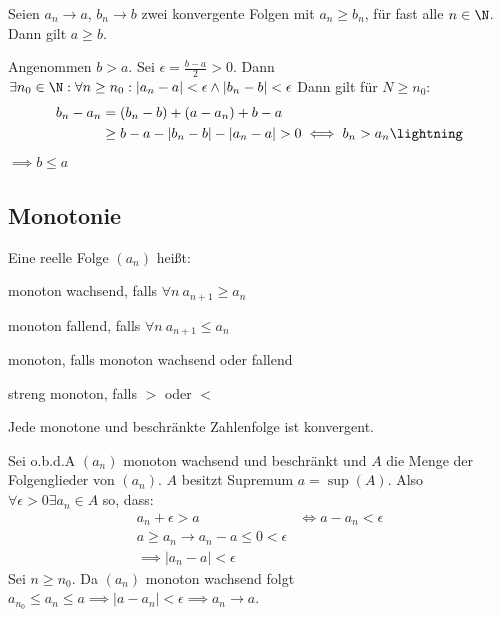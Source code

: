\begin{theorem}
	Seien $a_n\to a$, $b_n\to b$ zwei konvergente Folgen mit $a_n\geq b_n$, für fast alle $n\in \N$. Dann gilt $a\geq b$.
\end{theorem}
\prove Angenommen $b>a$. Sei $\epsilon=\frac{b-a}{2}>0$. Dann $\exists n_0\in \N: \forall n\geq n_0: |a_n-a|<\epsilon \land |b_n-b| <\epsilon$ Dann gilt für $N \geq n_0$:
\begin{align*}
	b_n-a_n&=(b_n-b)+(a-a_n)+b-a\\
	&\geq b-a-|b_n-b|-|a_n-a|>0 \iff b_n > a_n \text{\lightning}
\end{align*}
$\implies b\leq a$
\subsection{Monotonie}
\begin{definition}
	Eine reelle Folge $(a_n)$ heißt:
	\begin{enumerateroman}
		\item monoton wachsend, falls $\forall n\ a_{n+1}\geq a_n$
		\item monoton fallend, falls $\forall n\ a_{n+1}\leq a_n$
		\item monoton, falls monoton wachsend oder fallend
		\item streng monoton, falls $>$ oder $<$
	\end{enumerateroman}
\end{definition}
\begin{theorem}
	Jede monotone und beschränkte Zahlenfolge ist konvergent.
\end{theorem}
\prove Sei o.b.d.A $(a_n)$ monoton wachsend und beschränkt und $A$ die Menge der Folgenglieder von $(a_n)$. $A$ besitzt Supremum $a=\sup(A)$. Also $\forall \epsilon >0 \exists a_n\in A$ so, dass:
\begin{align*}
	a_n+\epsilon >a &\iff a-a_n < \epsilon\\
	a \geq a_n \to a_n-a \leq 0 < \epsilon \\
	\implies |a_n-a|< \epsilon
\end{align*}
Sei $n\geq n_0$. Da $(a_n)$ monoton wachsend folgt $a_{n_0}\leq a_n \leq a\implies |a-a_n|<\epsilon\implies a_n \to a$.
